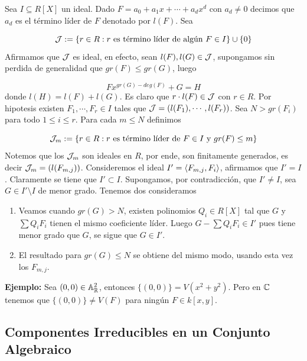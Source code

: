 \documentclass{article}
\begin{document}
\begin{dem}
    Sea $I\subseteq R[X]$ un ideal. Dado $F=a_{0}+a_{1}x+\cdots+a_{d}x^{d}$ con $a_{d}\neq0$
    decimos que $a_{d}$ es el término líder de $F$ denotado por $l(F)$. Sea
    
    \begin{equation*}
        \mathcal{J}:=\{r\in R:r \text{ es término líder de algún } F\in I\}\cup\{0\}
    \end{equation*}
    Afirmamos que $\mathcal{J}$ es ideal, en efecto, sean $l(F),l(G)\in\mathcal{J}$, supongamos sin perdida de 
    generalidad que $gr(F)\leq gr(G)$, luego
    
    \begin{equation*}
        Fx^{gr(G)-deg(F)}+G=H
    \end{equation*}
    donde $l(H)=l(F)+l(G)$. Es claro que $r\cdot l(F)\in\mathcal{J}$ con $r\in R$. Por hipotesis existen 
    $F_{1},\cdots,F_{r}\in I$ tales que $\mathcal{J}=(l(F_{1}),\cdots,l(F_{r}))$. Sea $N>gr(F_{i})$ para
    todo $1\leq i\leq r$. Para cada $m\leq N$ definimos

    \begin{equation*}
        \mathcal{J}_{m}:=\{r\in R:r\text{ es término líder de }F\in I\text{ y }gr(F)\leq m\}
    \end{equation*}
    Notemos que los $\mathcal{J}_{m}$ son ideales en $R$, por ende, son finitamente generados, es decir
    $\mathcal{J}_{m}=(l(F_{m,j}))$. Consideremos el ideal $I'=\left\langle{F_{m,j}, F_{i}}\right\rangle$, afirmamos que $I'=I$.
    Claramente se tiene que $I'\subset I$. Supongamos, por contradicción, que $I'\neq I$, sea 
    $G\in I'\setminus I$ de menor grado. Tenemos dos consideramos

    \begin{enumerate}
        \item Veamos cuando $gr(G)>N$, existen polinomios $Q_{i}\in R[X]$ tal que $G$ y 
        $\sum Q_{i}F_{i}$ tienen el mismo coeficiente líder. Luego $G-\sum Q_{i}F_{i}\in I'$ pues
        tiene menor grado que $G$, se sigue que $G\in I'$.

        \item El resultado para $gr(G)\leq N$ se obtiene del mismo modo, usando esta vez los 
        $F_{m,j}$.
    \end{enumerate}
\end{dem}

\noindent\textbf{Ejemplo:} Sea $(0,0)\in\mathbb{A}_{\mathbb{R}}^{2}$, entonces $\{(0,0)\}=V(x^{2}+y^{2})$. Pero en
$\mathbb{C}$ tenemos que $\{(0,0)\}\neq V(F)$ para ningún $F\in k[x,y]$.

\subsection{Componentes Irreducibles en un Conjunto Algebraico}
\end{document}
